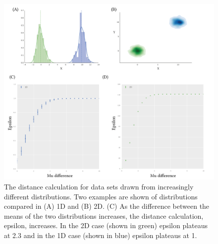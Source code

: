  
\begin{figure}[tb]
\centerfloat
\includegraphics[scale=0.8]{../../chapters/chapterABCFlow/images/mu_diff.png}
\caption[LoF caption]{\label{fig:epsilon_mud}The distance calculation for data sets drawn from increasingly different distributions. Two examples are shown of distributions compared in (A) 1D and (B) 2D. (C) As the difference between the means of the two distributions increases, the distance calculation, epsilon, increases. In the 2D case (shown in green) epsilon plateaus at 2.3 and in the 1D case (shown in blue) epsilon plateaus at 1.}
\label{fig:normal_example}
\end{figure}






